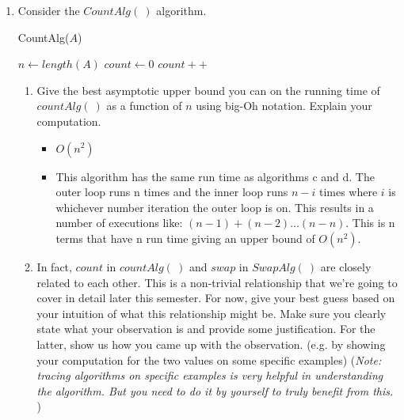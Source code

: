 \documentclass[11pt]{article}
\begin{document}
\begin{enumerate}
\begin{enumerate}
 \item Consider the $CountAlg(\ )$ algorithm.
 
 \begin{algorithm}[H]
      \caption{CountAlg($A$)} 
      $n \gets length(A)$ \;
      $count \gets 0$\;
      {
      {
      {
    $count ++$
    }
      }
      }
    \end{algorithm}
    
   
 
    
     \begin{enumerate}
       
        \item Give the best asymptotic upper bound you can on the running time of $countAlg(\ )$ as a function of $n$ using big-Oh notation. Explain your computation.

            \begin{itemize}
                \color{teal} 
                \item $O\left( n^2 \right)$
                \item This algorithm has the same run time as algorithms c and d. The outer loop runs n times and the inner loop runs $n-i$ times where $i$ is whichever number iteration the outer loop is on. This results in a number of executions like: $ (n-1) + (n-2) \ldots (n-n)$. This is n terms that have n run time giving an upper bound of $O(n^2)$.
            \end{itemize}


        \item In fact,  $count$ in $countAlg(\ )$ and $swap$ in $SwapAlg(\ )$ are closely related to each other. This is a non-trivial relationship  that we're going to cover in detail later this semester. For now, give your best guess based on your intuition of what this relationship might be. Make sure you clearly state what your observation is  and provide some justification. For the latter, show us how you came up with the observation. (e.g. by showing your computation for  the two values on some specific examples) (\emph{Note: tracing algorithms on specific examples is very helpful in understanding the algorithm. But you need to do it by yourself to truly benefit from this. })\\


\end{enumerate}
\end{enumerate}
\end{enumerate}
\end{document}
